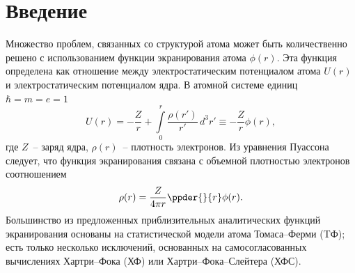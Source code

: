 \documentclass[10pt,pscyr]{hedlab}
\date{10.04.2014}
\begin{document}
  \makeheader

  \section{Введение}
  \label{sec:1}
  Множество проблем, связанных со структурой атома может быть количественно
  решено с использованием функции экранирования атома \( \phi(r) \). Эта
  функция определена как отношение между электростатическим потенциалом атома
  \( U(r) \) и электростатическим потенциалом ядра. В атомной системе единиц
  \( \hbar = m = e = 1 \)
  \begin{equation}
    U(r) = -\frac{Z}{r} + \int\limits_0^r \frac{\rho(r')}{r'}\,d^3r'
    \equiv -\frac{Z}{r}\phi(r),
  \label{eq:1}
  \end{equation}
  где \( Z \)~-- заряд ядра, \( \rho(r) \)~-- плотность электронов. Из
  уравнения Пуассона следует, что функция экранирования связана с объемной
  плотностью электронов соотношением 
  \begin{equation}
  \rho(r) = \frac{Z}{4\pi r}\ppder{}{r}\phi(r).
  \label{eq:2}
  \end{equation}
  Большинство из предложенных приблизительных аналитических функций
  экранирования основаны на статистической модели атома Томаса--Ферми (TФ);
  есть только несколько исключений, основанных на самосогласованных
  вычислениях Хартри--Фока (ХФ) или Хартри--Фока--Слейтера (ХФС).
  
\end{document}

